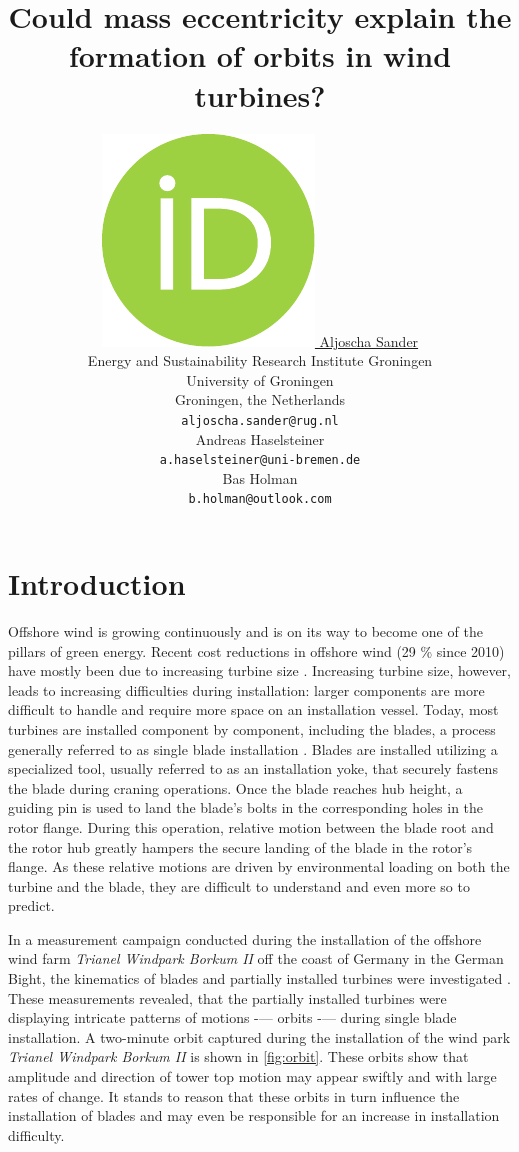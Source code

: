 \documentclass{article}
\title{Could mass eccentricity explain the formation of orbits in wind turbines?}
\author{ \href{https://orcid.org/0000-0001-8717-9688}{\includegraphics[scale=0.06]{orcid.pdf}\hspace{1mm} Aljoscha Sander} \\
	Energy and Sustainability Research Institute Groningen\\
	University of Groningen\\
	Groningen, the Netherlands \\
	\texttt{aljoscha.sander@rug.nl} \\
	\And
	Andreas Haselsteiner \\
	\texttt{a.haselsteiner@uni-bremen.de} \\
	\And
	Bas Holman \\
	\texttt{b.holman@outlook.com}\\
}
\begin{document}
\maketitle

\begin{abstract}
\end{abstract}




\section{Introduction}
\label{sec:introduction}

Offshore wind is growing continuously and is on its way to become one of the pillars of green energy. Recent cost reductions in offshore wind (29 \% since 2010) have mostly been due to increasing turbine size \citep{irenaRenewablePowerGeneration2020}. Increasing turbine size, however, leads to increasing difficulties during installation: larger components are more difficult to handle and require more space on an installation vessel. Today, most turbines are installed component by component, including the blades, a process generally referred to as single blade installation \citep{jiangInstallationOffshoreWind2021}. Blades are installed utilizing a specialized tool, usually referred to as an installation yoke, that securely fastens the blade during craning operations. Once the blade reaches hub height, a guiding pin is used to land the blade's bolts in the corresponding holes in the rotor flange. During this operation, relative motion between the blade root and the rotor hub greatly hampers the secure landing of the blade in the rotor's flange. As these relative motions are driven by environmental loading on both the turbine and the blade, they are difficult to understand and even more so to predict. 

In a measurement campaign conducted during the installation of the offshore wind farm \textit{Trianel Windpark Borkum II} off the coast of Germany in the German Bight, the kinematics of blades and partially installed turbines were investigated \citep{sanderRelativeMotionSingle2020,  sanderMONITORINGOFFSHOREWIND2020, sanderOscillationsOffshoreWind2020}. These measurements revealed, that the partially installed turbines were displaying intricate patterns of motions -— orbits -— during single blade installation. A two-minute orbit captured during the installation of the wind park \textit{Trianel Windpark Borkum II} is shown in \autoref{fig:orbit}. These orbits show that amplitude and direction of tower top motion may appear swiftly and with large rates of change. It stands to reason that these orbits in turn influence the installation of blades and may even be responsible for an increase in installation difficulty.
\end{document}
